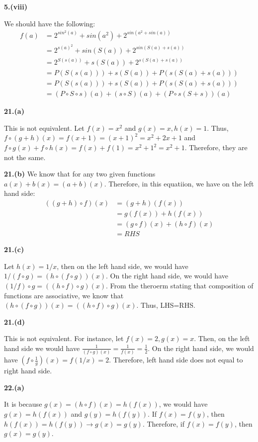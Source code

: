 \documentclass[a4paper,12pt]{report}
\begin{document}
\noindent
\textbf{5.(viii)}

\noindent
We should have the following:
\begin{align*}
f(a)&=2^{sin^2(a)}+sin(a^2)+2^{sin(a^2+sin(a))}\\
&=2^{s(a)^2}+sin(S(a))+2^{sin(S(a)+s(a))}\\
&=2^{S(s(a))}+s(S(a))+2^{s(S(a)+s(a))}\\
&=P(S(s(a)))+s(S(a))+P(s(S(a)+s(a)))\\
&=P(S(s(a)))+s(S(a))+P(s(S(a)+s(a)))\\
&=(P\circ S\circ s)(a)+(s\circ S)(a)+(P\circ s(S+s))(a)
\end{align*}

\noindent
\textbf{21.(a)}

\noindent
This is not equivalent. Let $f(x)=x^2$ and $g(x)=x,h(x)=1$. Thus, $f\circ (g+h)(x)=f(x+1)=(x+1)^2=x^2+2x+1$ and $f\circ g(x)+f\circ h(x)=f(x)+f(1)=x^2+1^2=x^2+1$. Therefore, they are not the same. 

\noindent
\textbf{21.(b)}
We know that for any two given functions $a(x)+b(x)=(a+b)(x)$. Therefore, in this equatiion, we have on the left hand side:
\begin{align*}
((g+h)\circ f)(x)
&=(g+h)(f(x))\\
&=g(f(x))+h(f(x))\\
&=(g\circ f)(x)+(h\circ f)(x)\\
&=RHS
\end{align*}

\noindent
\textbf{21.(c)}

\noindent
Let $h(x)=1/x$, then on the left hand side, we would have $1/(f\circ g)=(h\circ (f\circ g))(x)$. On the right hand side, we would have $(1/f)\circ g=((h\circ f)\circ g)(x)$. From the theroerm stating that composition of functions are associative, we know that $(h\circ (f\circ g))(x)=((h\circ f)\circ g)(x)$. Thus, LHS=RHS. 

\noindent
\textbf{21.(d)}

\noindent
This is not equivalent. For instance, let $f(x)=2, g(x) =x$. Then, on the left hand side we would have $\frac{1}{(f\circ g)(x)}=\frac{1}{f(x)}=\frac{1}{2}$. On the right hand side, we would have $(f\circ \frac{1}{g})(x)=f(1/x)=2$. Therefore, left hand side does not equal to right hand side. 

\noindent
\textbf{22.(a)}

\noindent
It is because $g(x)=(h\circ f)(x)=h(f(x))$, we would have $g(x)=h(f(x))$ and $g(y)=h(f(y))$. If $f(x)=f(y)$, then $h(f(x))=h(f(y))\rightarrow g(x)=g(y)$. Therefore, if $f(x)=f(y)$, then $g(x)=g(y)$.
\end{document}

